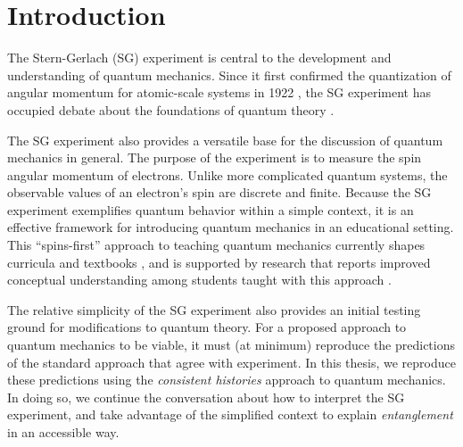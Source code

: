 %
%
%

\chapter{Introduction}

The Stern-Gerlach (SG) experiment is central to the development and understanding of quantum mechanics. Since it first confirmed the quantization of angular momentum for atomic-scale systems in 1922 \cite{stern}, the SG experiment has occupied debate about the foundations of quantum theory \cite{bocking}.

The SG experiment also provides a versatile base for the discussion of quantum mechanics in general. The purpose of the experiment is to measure the spin angular momentum of electrons. Unlike more complicated quantum systems, the observable values of an electron's spin are discrete and finite. Because the SG experiment exemplifies quantum behavior within a simple context, it is an effective framework for introducing quantum mechanics in an educational setting. This ``spins-first'' approach to teaching quantum mechanics currently shapes curricula \cite{gire} and textbooks \cite{mcintyre}, and is supported by research that reports improved conceptual understanding among students taught with this approach \cite{Sadaghiani}.

The relative simplicity of the SG experiment also provides an initial testing ground for modifications to quantum theory. For a proposed approach to quantum mechanics to be viable, it must (at minimum) reproduce the predictions of the standard approach that agree with experiment. In this thesis, we reproduce these predictions using the \textit{consistent histories} approach to quantum mechanics. In doing so, we continue the conversation about how to interpret the SG experiment, and take advantage of the simplified context to explain \textit{entanglement} in an accessible way.

